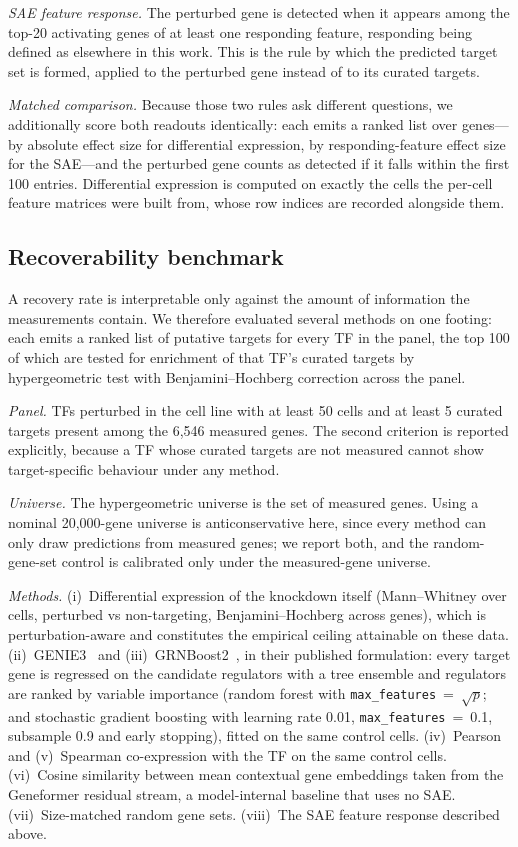 \emph{SAE feature response.} The perturbed gene is detected when it appears among the top-20
activating genes of at least one responding feature, responding being defined as elsewhere in this
work. This is the rule by which the predicted target set is formed, applied to the perturbed gene
instead of to its curated targets.

\emph{Matched comparison.} Because those two rules ask different questions, we additionally score
both readouts identically: each emits a ranked list over genes---by absolute effect size for
differential expression, by responding-feature effect size for the SAE---and the perturbed gene
counts as detected if it falls within the first 100 entries. Differential expression is computed on
exactly the cells the per-cell feature matrices were built from, whose row indices are recorded
alongside them.

\subsection*{Recoverability benchmark}

A recovery rate is interpretable only against the amount of information the measurements contain.
We therefore evaluated several methods on one footing: each emits a ranked list of putative targets
for every TF in the panel, the top 100 of which are tested for enrichment of that TF's curated
targets by hypergeometric test with Benjamini--Hochberg correction across the panel.

\emph{Panel.} TFs perturbed in the cell line with at least 50 cells and at least 5 curated targets
present among the 6,546 measured genes. The second criterion is reported explicitly, because a TF
whose curated targets are not measured cannot show target-specific behaviour under any method.

\emph{Universe.} The hypergeometric universe is the set of measured genes. Using a nominal
20,000-gene universe is anticonservative here, since every method can only draw predictions from
measured genes; we report both, and the random-gene-set control is calibrated only under the
measured-gene universe.

\emph{Methods.} (i)~Differential expression of the knockdown itself (Mann--Whitney over cells,
perturbed vs non-targeting, Benjamini--Hochberg across genes), which is perturbation-aware and
constitutes the empirical ceiling attainable on these data. (ii)~GENIE3~\cite{huynhthu2010genie3}
and (iii)~GRNBoost2~\cite{moerman2019grnboost2}, in their published formulation: every target gene
is regressed on the candidate regulators with a tree ensemble and regulators are ranked by variable
importance (random forest with \texttt{max\_features}~=~$\sqrt{p}$; and stochastic gradient boosting
with learning rate 0.01, \texttt{max\_features}~=~0.1, subsample 0.9 and early stopping), fitted on
the same control cells. (iv)~Pearson and (v)~Spearman co-expression with the TF on the same control
cells. (vi)~Cosine similarity between mean contextual gene embeddings taken from the Geneformer
residual stream, a model-internal baseline that uses no SAE. (vii)~Size-matched random gene sets.
(viii)~The SAE feature response described above.

